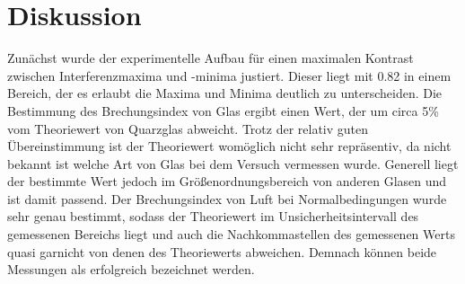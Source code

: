 \section{Diskussion}
    Zunächst wurde der experimentelle Aufbau für einen maximalen Kontrast zwischen Interferenzmaxima und -minima justiert. Dieser liegt mit \num{0.82} in einem Bereich, der es erlaubt die Maxima und Minima 
    deutlich zu unterscheiden.\newline
    Die Bestimmung des Brechungsindex von Glas ergibt einen Wert, der um circa 5\% vom Theoriewert von Quarzglas abweicht. Trotz der relativ guten Übereinstimmung ist der Theoriewert womöglich nicht sehr 
    repräsentiv, da nicht bekannt ist welche Art von Glas bei dem Versuch vermessen wurde. Generell liegt der bestimmte Wert jedoch im Größenordnungsbereich von anderen Glasen und ist damit passend.\newline
    Der Brechungsindex von Luft bei Normalbedingungen wurde sehr genau bestimmt, sodass der Theoriewert im Unsicherheitsintervall des gemessenen Bereichs liegt und auch die Nachkommastellen des gemessenen 
    Werts quasi garnicht von denen des Theoriewerts abweichen.\newline
    Demnach können beide Messungen als erfolgreich bezeichnet werden.       
    
